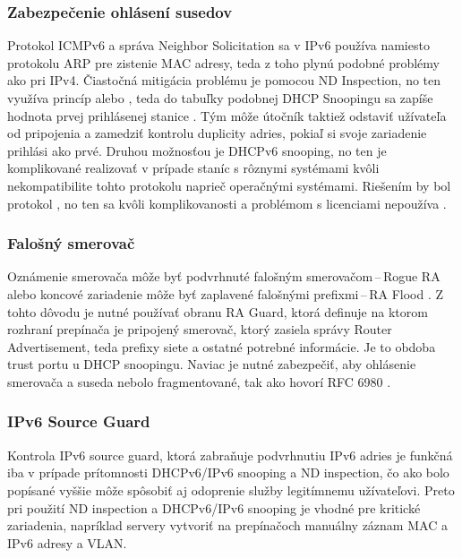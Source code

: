 \subsubsection*{Zabezpečenie ohlásení susedov}
Protokol ICMPv6 a správa Neighbor Solicitation sa v IPv6 používa namiesto protokolu ARP pre zistenie MAC adresy, teda z toho plynú podobné problémy ako pri IPv4. Čiastočná mitigácia problému je pomocou ND Inspection, no ten využíva princíp  alebo , teda do tabuľky podobnej DHCP Snoopingu sa zapíše hodnota prvej prihlásenej stanice \cite{Gregr522015} \cite{Podermanski1222015}. Tým môže útočník taktiež odstaviť užívateľa od pripojenia a zamedziť kontrolu duplicity adries, pokiaľ si svoje zariadenie prihlási ako prvé. Druhou možnosťou je DHCPv6 snooping, no ten je komplikované realizovať v prípade staníc s rôznymi systémami kvôli nekompatibilite tohto protokolu naprieč operačnými systémami. Riešením by bol protokol , no ten sa kvôli komplikovanosti a problémom s licenciami nepoužíva \cite{Alsadeh1252015}.   

\subsubsection*{Falošný smerovač}
Oznámenie smerovača môže byť podvrhnuté falošným smerovačom\,--\,Rogue RA alebo koncové zariadenie môže byť zaplavené falošnými prefixmi\,--\,RA Flood \cite{Gregr522015} \cite{Podermanski1222015}. Z tohto dôvodu je nutné používať obranu RA Guard, ktorá definuje na ktorom rozhraní prepínača je pripojený smerovač, ktorý zasiela správy Router Advertisement, teda prefixy siete a ostatné potrebné informácie. Je to obdoba trust portu u DHCP snoopingu. Naviac je nutné zabezpečiť, aby ohlásenie smerovača a suseda nebolo fragmentované, tak ako hovorí RFC 6980 \cite{rfc6980YBLH6JtaHyFaxE8i}.

\subsubsection*{IPv6 Source Guard}
Kontrola IPv6 source guard, ktorá zabraňuje podvrhnutiu IPv6 adries je funkčná iba v prípade prítomnosti DHCPv6/IPv6 snooping a ND inspection, čo ako bolo popísané vyššie môže spôsobiť aj odoprenie služby legitímnemu užívateľovi. Preto pri použití ND inspection a DHCPv6/IPv6 snooping je vhodné pre kritické zariadenia, napríklad servery vytvoriť na prepínačoch manuálny záznam MAC a IPv6 adresy a VLAN.    

